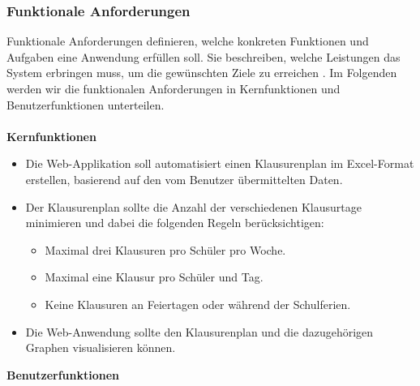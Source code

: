 \subsubsection{Funktionale Anforderungen}
Funktionale Anforderungen definieren, welche konkreten Funktionen und Aufgaben eine Anwendung erfüllen soll. Sie beschreiben, welche Leistungen das System erbringen muss, um die gewünschten Ziele zu erreichen \parencite{anforderungen}. Im Folgenden werden wir die funktionalen Anforderungen in Kernfunktionen und Benutzerfunktionen unterteilen.\\\\
\textbf{Kernfunktionen}
\begin{itemize}
    \item Die Web-Applikation soll automatisiert einen Klausurenplan im Excel-Format erstellen, basierend auf den vom Benutzer übermittelten Daten.

    \item Der Klausurenplan sollte die Anzahl der verschiedenen Klausurtage minimieren und dabei die folgenden Regeln berücksichtigen:
    \begin{itemize}
        \item Maximal drei Klausuren pro Schüler pro Woche.
        \item Maximal eine Klausur pro Schüler und Tag.
        \item Keine Klausuren an Feiertagen oder während der Schulferien.
    \end{itemize}

    \item Die Web-Anwendung sollte den Klausurenplan und die dazugehörigen Graphen visualisieren können.
\end{itemize}
\textbf{Benutzerfunktionen}
